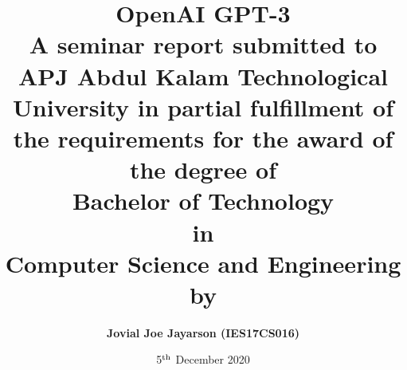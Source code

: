 \usepackage{float}
\usepackage{natbib}
\usepackage{amsmath}
\usepackage{comment}
\usepackage{graphicx}
\usepackage{etoolbox}
\usepackage{geometry}
\usepackage{fancyhdr}
\usepackage{amsfonts}
\usepackage{tocbibind} %
\usepackage[T1]{fontenc}
\usepackage[utf8]{inputenc} %
\usepackage[UKenglish]{babel}
\usepackage[section]{placeins}
\usepackage[dvipsnames]{xcolor}
\usepackage[pdftex, pdfauthor={Jovial Joe Jayarson}, pdftitle={OpenAI GPT-3}, pdfsubject={Language Model - Seminar Report}]{hyperref}

\hypersetup{
    colorlinks      = true,
    urlcolor        = gray,
    linkcolor       = magenta,
    citecolor       = brown,
    citebordercolor = green,
    urlbordercolor  = white,
    linkbordercolor = blue,
}

\graphicspath{{../images/}}
\setlength{\headheight}{32pt}

\title{\textbf{OpenAI GPT-3} \\ \vspace{1cm} \large A seminar report submitted to APJ Abdul Kalam Technological University in partial fulfillment of the requirements for the award of the degree of \\ \vspace{0.5cm} \large \textbf{Bachelor of Technology \\ in \\ Computer Science and Engineering} \\ \vspace{0.5cm} \large by}
\author{\textbf{Jovial Joe Jayarson (IES17CS016)}}
\date{5$^{\textnormal{th}}$ December 2020}

\makeatletter
\patchcmd{\f@nch@head}{\rlap}{\color{gray}\rlap}{}{}
\patchcmd{\f@nch@foot}{\rlap}{\color{gray}\rlap}{}{}
\makeatother

\pagestyle{fancy}
\fancyhf{}
\rfoot{\thepage}
\renewcommand{\headrulewidth}{0pt}
\renewcommand{\footrulewidth}{0pt}

